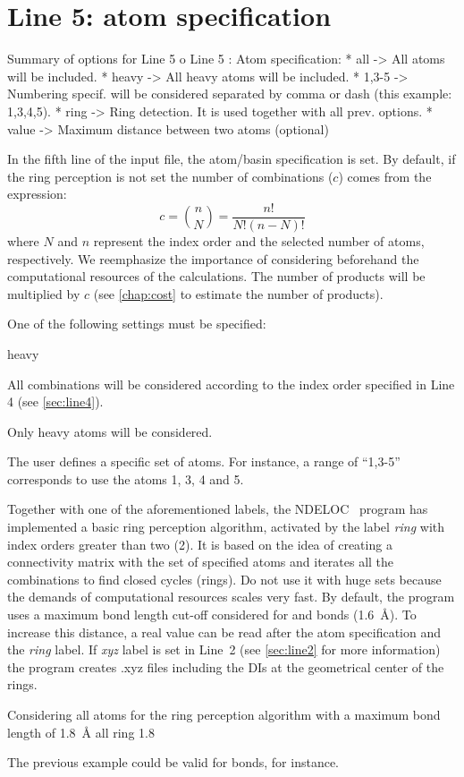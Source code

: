 \documentclass[a4paper,11pt,openany]{memoir}
\newcommand\programa{\textsc{NDELOC}}
\begin{document}
\section{Line 5: atom specification}\label{sec:line5}
\begin{recuadro}{Summary of options for Line 5}
o Line 5 :  Atom specification:
 *  all    -> All atoms will be included.
 *  heavy  -> All heavy atoms will be included.
 *  1,3-5  -> Numbering specif. will be considered separated by comma or
              dash (this example: 1,3,4,5).
 *  ring   -> Ring detection. It is used together with all prev. options.
 *  value  -> Maximum distance between two atoms (optional)
\end{recuadro}
In the fifth line of the input file, the atom/basin specification is set. By default, if the ring perception is not set the number of combinations ($c$) comes from the expression:
\begin{equation}
	c = \binom{n}{N} = \frac{n!}{N!(n-N)!}
\end{equation}
where $N$ and $n$ represent the index order and the selected number of atoms, respectively. We reemphasize the importance of considering beforehand the computational resources of the calculations. The number of products will be multiplied by $c$ (see \autoref{chap:cost} to estimate the number of products).

One of the following settings must be specified:
\begin{labeling}{heavy}
	\item[all] All combinations will be considered according to the index order specified in Line 4 (see \autoref{sec:line4}).
	\item[heavy] Only heavy atoms will be considered.
	\item[\emph{range}] The user defines a specific set of atoms. For instance, a range of ``1,3-5'' corresponds to use the atoms 1, 3, 4 and 5.
\end{labeling}
Together with one of the aforementioned labels, the \programa~ program has implemented a basic ring perception algorithm, activated by the label \emph{ring} with index orders greater than two (2). It is based on the idea of creating a connectivity matrix with the set of specified atoms and iterates all the combinations to find closed cycles (rings). Do not use it with huge sets because the demands of computational resources scales very fast. By default, the program uses a maximum bond length cut-off considered for  and  bonds (\SI{1.6}{\angstrom}). To increase this distance, a real value can be read after the atom specification and the \emph{ring} label. If \emph{xyz} label is set in Line~2 (see \autoref{sec:line2} for more information) the program creates .xyz files including the \acp{DI} at the geometrical center of the rings.
\begin{myexample}{Considering all atoms for the ring perception algorithm with a maximum bond length of \SI{1.8}{\angstrom}}
all ring 1.8
\end{myexample}
The previous example could be valid for  bonds, for instance.
\end{document}
